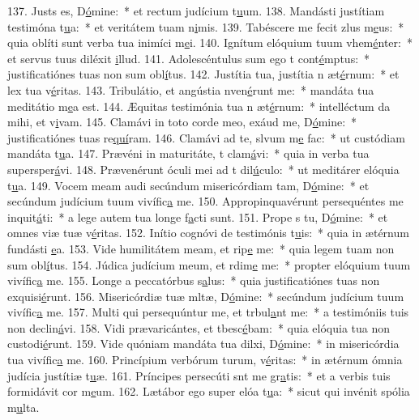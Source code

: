 137. Justs es, D\uline{ó}mine:~* et rectum judícium t\uline{u}um.
138. Mandásti justítiam testimóna t\uline{u}a:~* et veritátem tuam n\uline{i}mis.
139. Tabéscere me fecit zlus m\uline{e}us:~* quia oblíti sunt verba tua inimíci m\uline{e}i.
140. Ignítum elóquium tuum vhem\uline{é}nter:~* et servus tuus diléxit \uline{i}llud.
141. Adolescéntulus sum ego t cont\uline{é}mptus:~* justificatiónes tuas non sum obl\uline{í}tus.
142. Justítia tua, justítia n æt\uline{é}rnum:~* et lex tua v\uline{é}ritas.
143. Tribulátio, et angústia nven\uline{é}runt me:~* mandáta tua meditátio m\uline{e}a est.
144. Æquitas testimónia tua n æt\uline{é}rnum:~* intelléctum da mihi, et v\uline{i}vam.
145. Clamávi in toto corde meo, exáud me, D\uline{ó}mine:~* justificatiónes tuas re\uline{quí}ram.
146. Clamávi ad te, slvum m\uline{e} fac:~* ut custódiam mandáta t\uline{u}a.
147. Prævéni in maturitáte, t clam\uline{á}vi:~* quia in verba tua supersper\uline{á}vi.
148. Prævenérunt óculi mei ad t dil\uline{ú}culo:~* ut meditárer elóquia t\uline{u}a.
149. Vocem meam audi secúndum misericórdiam tam, D\uline{ó}mine:~* et secúndum judícium tuum vivífic\uline{a} me.
150. Appropinquavérunt persequéntes me inquit\uline{á}ti:~* a lege autem tua longe f\uline{a}cti sunt.
151. Prope s tu, D\uline{ó}mine:~* et omnes viæ tuæ v\uline{é}ritas.
152. Inítio cognóvi de testimónis t\uline{u}is:~* quia in ætérnum fundásti \uline{e}a.
153. Vide humilitátem meam, et rip\uline{e} me:~* quia legem tuam non sum obl\uline{í}tus.
154. Júdica judícium meum, et rdim\uline{e} me:~* propter elóquium tuum vivífic\uline{a} me.
155. Longe a peccatórbus s\uline{a}lus:~* quia justificatiónes tuas non exquisi\uline{é}runt.
156. Misericórdiæ tuæ mltæ, D\uline{ó}mine:~* secúndum judícium tuum vivífic\uline{a} me.
157. Multi qui persequúntur me, et trbul\uline{a}nt me:~* a testimóniis tuis non declin\uline{á}vi.
158. Vidi prævaricántes, et tbesc\uline{é}bam:~* quia elóquia tua non custodi\uline{é}runt.
159. Vide quóniam mandáta tua dilxi, D\uline{ó}mine:~* in misericórdia tua vivífic\uline{a} me.
160. Princípium verbórum turum, v\uline{é}ritas:~* in ætérnum ómnia judícia justítiæ t\uline{u}æ.
161. Príncipes persecúti snt me gr\uline{a}tis:~* et a verbis tuis formidávit cor m\uline{e}um.
162. Lætábor ego super elóa t\uline{u}a:~* sicut qui invénit spólia m\uline{u}lta.

